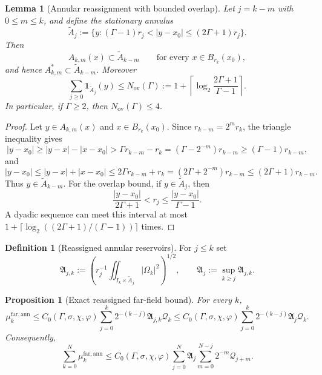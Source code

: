 \documentclass[11pt]{article}
\numberwithin{equation}{section}
\theoremstyle{plain}
\newtheorem{proposition}[theorem]{Proposition}
\newtheorem{lemma}[theorem]{Lemma}
\theoremstyle{definition}
\newtheorem{definition}[theorem]{Definition}
\theoremstyle{remark}
\begin{document}
\begin{lemma}[Annular reassignment with bounded overlap]\label{lem:annular-reassignment}
Let $j=k-m$ with $0\le m\le k$, and define the stationary annulus
\begin{equation}\label{eq:Ajtilde-def}
\widetilde A_j
:=
\{y:(\Gamma-1)r_j<|y-x_0|\le (2\Gamma+1)r_j\}.
\end{equation}
Then
\[
A_{k,m}(x)\subset \widetilde A_{k-m}
\qquad\text{for every }x\in B_{r_k}(x_0),
\]
and hence $A_{k,m}^*\subset \widetilde A_{k-m}$.  Moreover
\begin{equation}\label{eq:bounded-overlap-Aj}
\sum_{j\ge0}\mathbf 1_{\widetilde A_j}(y)
\le
N_{\mathrm{ov}}(\Gamma)
:=1+\left\lceil \log_2\frac{2\Gamma+1}{\Gamma-1}\right\rceil.
\end{equation}
In particular, if $\Gamma\ge2$, then $N_{\mathrm{ov}}(\Gamma)\le4$.
\end{lemma}

\begin{proof}
Let $y\in A_{k,m}(x)$ and $x\in B_{r_k}(x_0)$.  Since $r_{k-m}=2^m r_k$, the triangle inequality gives
\[
|y-x_0|\ge |y-x|-|x-x_0|>\Gamma r_{k-m}-r_k
=(\Gamma-2^{-m})r_{k-m}\ge (\Gamma-1)r_{k-m},
\]
and
\[
|y-x_0|\le |y-x|+|x-x_0|\le 2\Gamma r_{k-m}+r_k
=(2\Gamma+2^{-m})r_{k-m}\le (2\Gamma+1)r_{k-m}.
\]
Thus $y\in \widetilde A_{k-m}$.  For the overlap bound, if $y\in\widetilde A_j$, then
\[
\frac{|y-x_0|}{2\Gamma+1}<r_j\le \frac{|y-x_0|}{\Gamma-1}.
\]
A dyadic sequence can meet this interval at most $1+\lceil\log_2((2\Gamma+1)/(\Gamma-1))\rceil$ times.
\end{proof}

\begin{definition}[Reassigned annular reservoirs]\label{def:reassigned-reservoirs}
For $j\le k$ set
\begin{equation}\label{eq:Ajk-def}
\mathfrak A_{j,k}
:=
\left(
 r_j^{-1}\iint_{I_k\times\widetilde A_j}|\Omega_k|^2
\right)^{1/2},
\qquad
\mathfrak A_j:=\sup_{k\ge j}\mathfrak A_{j,k}.
\end{equation}
\end{definition}

\begin{proposition}[Exact reassigned far-field bound]\label{prop:reassigned-farfield}
For every $k$,
\begin{equation}\label{eq:reassigned-farfield}
\mu_k^{\mathrm{far,ann}}
\le
C_0(\Gamma,\sigma,\chi,\varphi)
\sum_{j=0}^{k}2^{-(k-j)}\mathfrak A_{j,k}\mathcal Q_k
\le
C_0(\Gamma,\sigma,\chi,\varphi)
\sum_{j=0}^{k}2^{-(k-j)}\mathfrak A_j\mathcal Q_k.
\end{equation}
Consequently,
\begin{equation}\label{eq:shell-to-core-convolution}
\sum_{k=0}^{N}\mu_k^{\mathrm{far,ann}}
\le
C_0(\Gamma,\sigma,\chi,\varphi)
\sum_{j=0}^{N}\mathfrak A_j
\sum_{m=0}^{N-j}2^{-m}\mathcal Q_{j+m}.
\end{equation}
\end{proposition}
\end{document}
